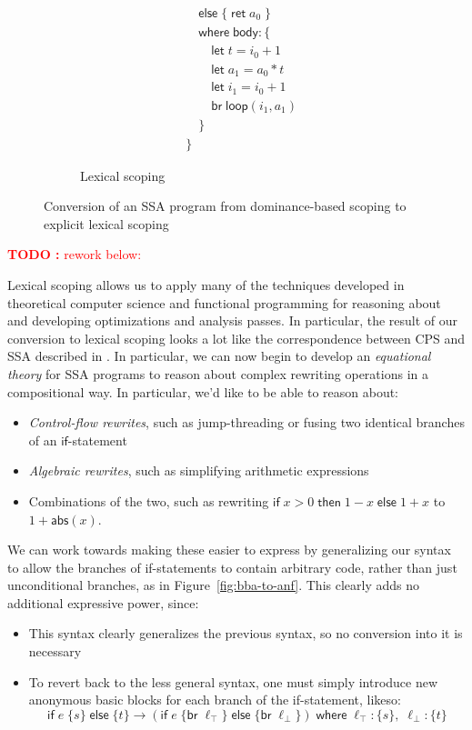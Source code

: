 \documentclass[acmsmall,screen,review]{acmart}
\newcounter{todos}
\newcommand{\TODO}[1]{{
  \stepcounter{todos}
  \begin{center}\large{\textcolor{red}{\textbf{TODO \arabic{todos}:} #1}}\end{center}
}}
\newcommand{\ms}[1]{\ensuremath{\mathsf{#1}}}
\begin{document}
\begin{figure}
\begin{subfigure}[t]{.5\textwidth}
\begin{align*}
      & \quad \ms{else}\;\{\;\ms{ret}\;a_0\;\} \\
      & \quad \ms{where}\;\ms{body}: \{\\ 
      & \qquad \ms{let}\;t = i_0 + 1 \\
      & \qquad \ms{let}\;a_1 = a_0 * t \\
      & \qquad \ms{let}\;i_1 = i_0 + 1 \\
      & \qquad \ms{br}\;\ms{loop}(i_1, a_1) \\
      & \quad \} \\
      & \}
    \end{align*}
    \caption{Lexical scoping}
  \end{subfigure}
  \caption{Conversion of an SSA program from dominance-based scoping to explicit lexical scoping}
  \Description{}
  \label{fig:dominance-to-lexical}
\end{figure}

\TODO{rework below:}

Lexical scoping allows us to apply many of the techniques developed in theoretical computer science
and functional programming for reasoning about and developing optimizations and analysis passes. In
particular, the result of our conversion to lexical scoping looks a lot like the correspondence
between CPS and SSA described in \citet{kelsey-95-cps}. In particular, we can now begin to develop
an \textit{equational theory} for SSA programs to reason about complex rewriting operations in a
compositional way. In particular, we'd like to be able to reason about:
\begin{itemize}
  \item \textit{Control-flow rewrites}, such as jump-threading or fusing two identical branches of
  an \ms{if}-statement
  \item \textit{Algebraic rewrites}, such as simplifying arithmetic expressions
  \item Combinations of the two, such as rewriting $\ms{if}\;x > 0\;\ms{then}\;1 - x\;\ms{else}\;1 +
  x$ to $1 + \ms{abs}(x)$.
\end{itemize}

We can work towards making these easier to express by generalizing our syntax to allow the branches
of if-statements to contain arbitrary code, rather than just unconditional branches, as in
Figure~\ref{fig:bba-to-anf}. This clearly adds no additional expressive power, since:
\begin{itemize}
  \item This syntax clearly generalizes the previous syntax, so no conversion into it is necessary
  \item To revert back to the less general syntax, one must simply introduce new anonymous basic
  blocks for each branch of the if-statement, likeso:
  \begin{equation}
    \ms{if}\;e\;\{s\}\;\ms{else}\;\{t\}
    \to (\ms{if}\;e\;\{\ms{br}\;\ell_\top\}\;\ms{else}\;\{\ms{br}\;\ell_\bot\})\;
        \ms{where}\;\ell_\top: \{s\},\;\ell_\bot: \{t\}
  \end{equation}
\end{itemize}
\end{document}
